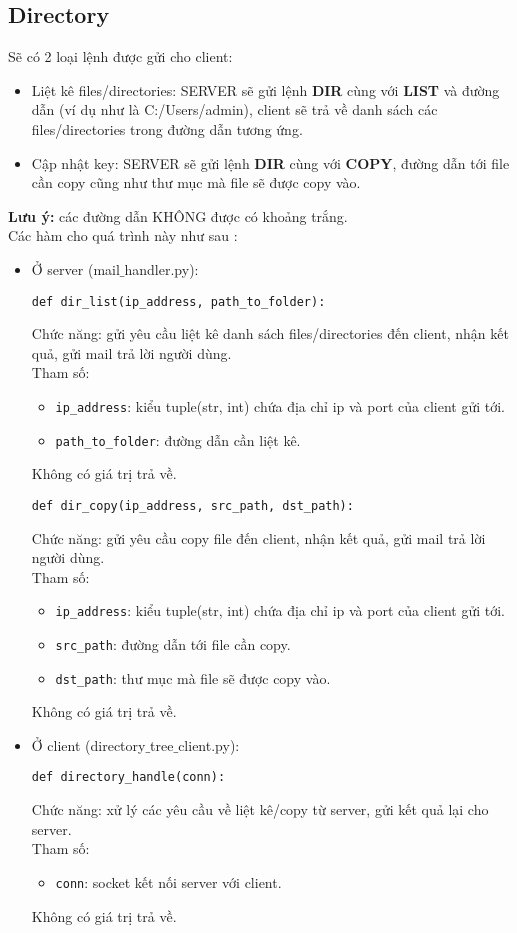 \subsection{Directory}
Sẽ có 2 loại lệnh được gửi cho client:
\begin{itemize}
\item Liệt kê files/directories: SERVER sẽ gửi lệnh \textbf{DIR} cùng với \textbf{LIST} và đường dẫn (ví dụ như là C:/Users/admin), client sẽ trả về danh sách các files/directories trong đường dẫn tương ứng.
\item Cập nhật key: SERVER sẽ gửi lệnh \textbf{DIR} cùng với \textbf{COPY}, đường dẫn tới file cần copy cũng như thư mục mà file sẽ được copy vào.
\end{itemize}
\textbf{Lưu ý:} các đường dẫn KHÔNG được có khoảng trắng.\\
Các hàm cho quá trình này như sau :
\begin{itemize}
\item Ở server (mail$\_$handler.py):
\begin{lstlisting}
def dir_list(ip_address, path_to_folder):
\end{lstlisting}
Chức năng: gửi yêu cầu liệt kê danh sách files/directories đến client, nhận kết quả, gửi mail trả lời người dùng.\\
Tham số: 
\begin{itemize}
\item \lstinline{ip_address}: kiểu tuple(str, int) chứa địa chỉ ip và port của client gửi tới.
\item \lstinline{path_to_folder}: đường dẫn cần liệt kê. 
\end{itemize}
Không có giá trị trả về.

\begin{lstlisting}
def dir_copy(ip_address, src_path, dst_path):
\end{lstlisting}
Chức năng: gửi yêu cầu copy file đến client, nhận kết quả, gửi mail trả lời người dùng.\\
Tham số: 
\begin{itemize}
\item \lstinline{ip_address}: kiểu tuple(str, int) chứa địa chỉ ip và port của client gửi tới.
\item \lstinline{src_path}: đường dẫn tới file cần copy.
\item \lstinline{dst_path}: thư mục mà file sẽ được copy vào.
\end{itemize}
Không có giá trị trả về.

\item Ở client (directory$\_$tree$\_$client.py):
\begin{lstlisting}
def directory_handle(conn):
\end{lstlisting}
Chức năng: xử lý các yêu cầu về liệt kê/copy từ server, gửi kết quả lại cho server.\\
Tham số: 
\begin{itemize}
\item \lstinline{conn}: socket kết nối server với client.
\end{itemize}
Không có giá trị trả về.
\end{itemize}


